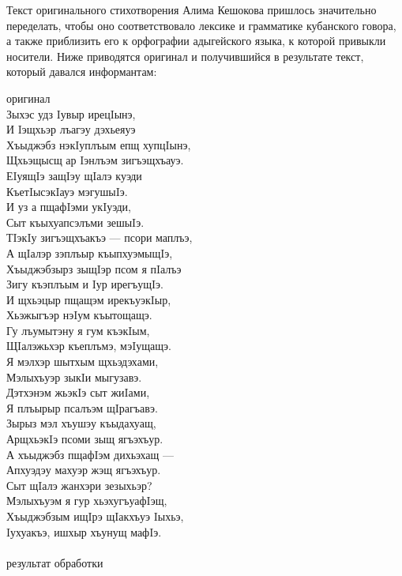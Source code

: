 \noindent Текст оригинального стихотворения Алима Кешокова пришлось значительно переделать, чтобы оно соответствовало лексике и грамматике кубанского говора, а также приблизить его к орфографии адыгейского языка, к которой привыкли носители. Ниже приводятся оригинал и получившийся в результате текст, который давался информантам:
\begin{multicols}{2}
\noindent оригинал \medskip\\
Зыхэс удз Iувыр ирецIынэ,\\
И Iэщхьэр лъагэу дэхьеяуэ\\
Хъыджэбз нэкIуплъым епщ хупцIынэ,\\
Щхьэщысщ ар Iэнлъэм зигъэщхъауэ.\medskip\\
ЕIуящIэ защIэу щIалэ куэди\\
КъетIысэкIауэ мэгушыIэ.\\
И уз а пщафIэми укIуэди,\\
Сыт къыхуапсэлъми зешыIэ.\medskip\\
ТIэкIу зигъэщхъакъэ --- псори маплъэ,\\
А щIалэр зэплъыр къыпхуэмыщIэ,\\
Хъыджэбзырз зыщIэр псом я пIалъэ\\
Зигу къэплъым и Iур ирегъущIэ. \medskip\\
И щхьэцыр пщащэм ирекъуэкIыр,\\
Хьэжыгъэр нэIум къытощащэ.\\
Гу лъумытэну я гум къэкIым,\\
ЩIалэжьхэр къеплъмэ, мэIущащэ.\medskip\\ 
Я мэлхэр шытхым щхьэдэхами,\\
Мэлыхъуэр зыкIи мыгузавэ.\\
Дэтхэнэм жьэкIэ сыт жиIами,\\
Я плъырыр псалъэм щIрагъавэ.\medskip\\
Зырыз мэл хъушэу къыдахуащ,\\
АрщхьэкIэ псоми зыщ ягъэхъур.\\
А хъыджэбз пщафIэм дихьэхащ --- \\
Апхуэдэу махуэр жэщ ягъэхъур. \medskip\\
Сыт щIалэ жанхэри зезыхьэр?\\
Мэлыхъуэм я гур хьэхугъуафIэщ,\\
Хъыджэбзым ищIрэ щIакхъуэ Iыхьэ,\\
Iухуакъэ, ишхыр хъунущ мафIэ.\\
\columnbreak\\
\noindent результат обработки \medskip\\

\end{multicols}
